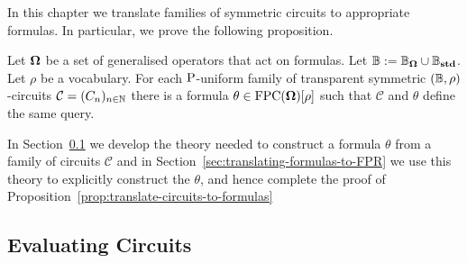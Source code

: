 \documentclass[../main/thesis.tex]{subfiles}
\begin{document}

In this chapter we translate families of symmetric circuits to appropriate
formulas. In particular, we prove the following proposition.

\begin{prop}
  Let $\mathbf{\mathbf{\Omega}}$ be a set of generalised operators that act on formulas. Let $\mathbb{B}
  := \mathbb{B}_{\mathbf{\mathbf{\Omega}}} \cup \mathbb{B}_{\text{\textbf{std}}}$. Let $\rho$ be a vocabulary. For each
  $\mathrm{P}$-uniform family of transparent symmetric $(\mathbb{B}, \rho)$-circuits
  $\mathcal{C} = (C_n)_{n \in \mathbb{N}}$ there is a formula $\theta \in
  \text{\upshape FPC}(\mathbf{\mathbf{\Omega}})[\rho]$ such that $\mathcal{C}$ and $\theta$ define the same
  query.
  \label{prop:translate-circuits-to-formulas}
\end{prop}

In Section~\ref{sec:evaluating-circuits} we develop the theory needed to
construct a formula $\theta$ from a family of circuits $\mathcal{C}$ and in
Section~\ref{sec:translating-formulas-to-FPR} we use this theory to explicitly
construct the $\theta$, and hence complete the proof of
Proposition~\ref{prop:translate-circuits-to-formulas}

\subsection {Evaluating Circuits}
\label{sec:evaluating-circuits}


\end{document}
